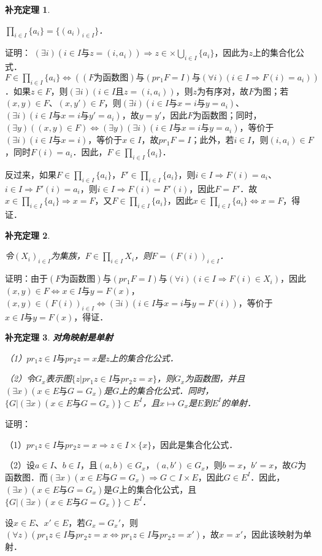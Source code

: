 \documentclass[12pt, a4paper, oneside]{book}
\newtheorem{cor}{补充定理}
\begin{document}
			\begin{cor}\label{cor132}
				\hfill\par
				$\prod\limits_{i\in I}\{a_i\}=\{(a_i)_{i\in I}\}$．
			\end{cor}
			证明：
			$(\exists i)(i\in I\text{与}z=(i, a_i))\Rightarrow z\in \times \bigcup\limits_{i\in I}\{a_i\}$，因此为$z$上的集合化公式．
			$F\in \prod\limits_{i\in I}\{a_i\}\Leftrightarrow ((F\text{为函数图})\text{与}(pr_1F= I)\text{与}(\forall i)(i\in I\Rightarrow F(i)=a_i))$．如果$z\in F$，则$(\exists i)(i\in I且z=(i, a_i))$，则$z\text{为有序对}$，故$F$为图；若$(x, y)\in F$、$(x, y')\in F$，则$(\exists i)(i\in I\text{与}x=i\text{与}y=a_i)$、$(\exists i)(i\in I\text{与}x=i\text{与}y'=a_i)$，故$y=y'$，因此$F$为函数图；同时，$(\exists y)((x, y)\in F)\Leftrightarrow (\exists y)(\exists i)(i\in I\text{与}x=i\text{与}y=a_i)$，等价于$(\exists i)(i\in I\text{与}x=i)$，等价于$x\in I$，故$pr_1F= I$；此外，若$i\in I$，则$(i, a_i)\in F$，同时$F(i)=a_i$．因此，$F\in \prod\limits_{i\in I}\{a_i\}$．
			\par
			反过来，如果$F\in \prod\limits_{i\in I}\{a_i\}$，$F'\in \prod\limits_{i\in I}\{a_i\}$，则$i\in I\Rightarrow F(i)=a_i$、$i\in I\Rightarrow F'(i)=a_i$，则$i\in I\Rightarrow F(i)=F'(i)$，因此$F=F'$．故$x\in \prod\limits_{i\in I}\{a_i\}\Rightarrow x=F$，又$F\in \prod\limits_{i\in I}\{a_i\}$，因此$x\in \prod\limits_{i\in I}\{a_i\}\Leftrightarrow x=F$，得证．
			
			\begin{cor}\label{cor133}
				\hfill\par
				令$(X_i)_{i\in I}$为集族，$F\in \prod\limits_{i\in I}X_i$，则$F=(F(i))_{i\in I}$．
			\end{cor}
			证明：由于$(F\text{为函数图})\text{与}(pr_1F= I)\text{与}(\forall i)(i\in I\Rightarrow F(i)\in X_i)$，因此$(x, y)\in F\Leftrightarrow x\in I\text{与}y=F(x)$，$(x, y)\in (F(i))_{i\in I}\Leftrightarrow (\exists i)(i\in I\text{与}x=i\text{与}y=F(i))$，等价于$x\in I\text{与}y=F(x)$，得证．
						
			\begin{cor}\label{cor134}
				\textbf{对角映射是单射}
				\par
				（1）$pr_1z\in I\text{与}pr_2z=x$是$z$上的集合化公式．
				\par
				（2）令$G_x$表示图$\{z|pr_1z\in I\text{与}pr_2z=x\}$，则$G_x$为函数图，并且$(\exists x)(x\in E\text{与}G=G_x)$是$G$上的集合化公式．同时，$\{G|(\exists x)(x\in E\text{与}G=G_x)\}\subset E^I$，且$x\mapsto G_x$是$E$到$E^I$的单射．
			\end{cor}
			证明：
			\par
			（1）$pr_1z\in I\text{与}pr_2z=x\Rightarrow z\in I\times \{x\}$，因此是集合化公式．
			\par
			（2）设$a\in I$、$b\in I$，且$(a, b)\in G_x$，$(a, b')\in G_x$，则$b=x$，$b'=x$，故$G$为函数图．而$(\exists x)(x\in E\text{与}G=G_x)\Rightarrow G\subset I\times E$，因此$G\in E^I$．因此，$(\exists x)(x\in E\text{与}G=G_x)$是$G$上的集合化公式，且$\{G|(\exists x)(x\in E\text{与}G=G_x)\}\subset E^I$．
			\par
			设$x\in E$、$x'\in E$，若$G_x=G_x'$，则$(\forall z)(pr_1z\in I\text{与}pr_2z=x\Leftrightarrow pr_1z\in I\text{与}pr_2z=x')$，故$x=x'$，因此该映射为单射．
\end{document}
